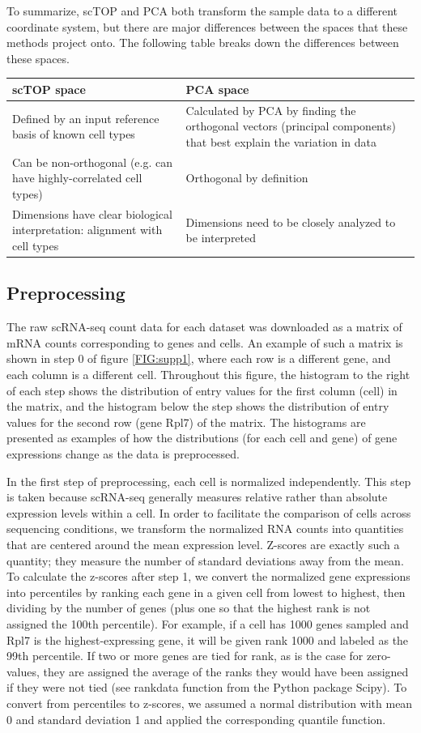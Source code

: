 \documentclass[aps,superscriptaddress, notitlepage,longbibliography]{revtex4-1}
\begin{document}
To summarize, scTOP and PCA both transform the sample data to a different coordinate system, but there are major differences between the spaces that these methods project onto. The following table breaks down the differences between these spaces.

\begin{tabular}{ |p{3in}|p{3in}|} 
 \hline
 scTOP space & PCA space\\ 
 \hline
 \hline
 Defined by an input reference basis of known cell types & Calculated by PCA by finding the orthogonal vectors (principal components) that best explain the variation in data  \\ 
 \hline
 Can be non-orthogonal (e.g. can have highly-correlated cell types) & Orthogonal by definition  \\ 
 \hline
 Dimensions have clear biological interpretation: alignment with cell types & Dimensions need to be closely analyzed to be interpreted \\
 \hline
\end{tabular}

\subsection{Preprocessing} \label{preprocessing}
The raw scRNA-seq count data for each dataset was downloaded as a matrix of mRNA counts corresponding to genes and cells. An example of such a matrix is shown in step 0 of figure \ref{FIG:supp1}, where each row is a different gene, and each column is a different cell. Throughout this figure, the histogram to the right of each step shows the distribution of entry values for the first column (cell) in the matrix, and the histogram below the step shows the distribution of entry values for the second row (gene Rpl7) of the matrix. The histograms are presented as examples of how the distributions (for each cell and gene) of gene expressions change as the data is preprocessed.

In the first step of preprocessing, each cell is normalized independently. This step is taken because scRNA-seq generally measures relative rather than absolute expression levels within a cell. In order to facilitate the comparison of cells across sequencing conditions, we transform the normalized RNA counts into quantities that are centered around the mean expression level. Z-scores are exactly such a quantity; they measure the number of standard deviations away from the mean. To calculate the z-scores after step 1, we convert the normalized gene expressions into percentiles by ranking each gene in a given cell from lowest to highest, then dividing by the number of genes (plus one so that the highest rank is not assigned the 100th percentile). For example, if a cell has 1000 genes sampled and Rpl7 is the highest-expressing gene, it will be given rank 1000 and labeled as the 99th percentile. If two or more genes are tied for rank, as is the case for zero-values, they are assigned the average of the ranks they would have been assigned if they were not tied (see rankdata function from the Python package Scipy). To convert from percentiles to z-scores, we assumed a normal distribution with mean 0 and standard deviation 1 and applied the corresponding quantile function.
\end{document}
